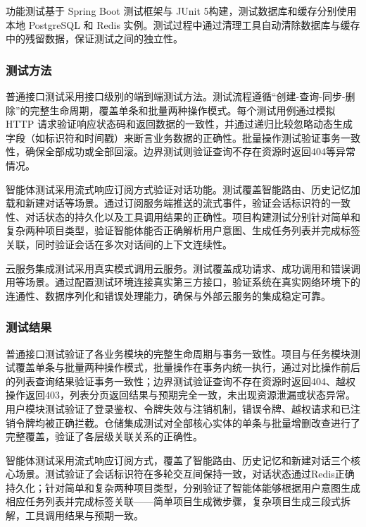 \par 功能测试基于 Spring Boot 测试框架与 JUnit 5构建，测试数据库和缓存分别使用本地 PostgreSQL 和 Redis 实例。测试过程中通过清理工具自动清除数据库与缓存中的残留数据，保证测试之间的独立性。

\subsubsection{测试方法}

\par 普通接口测试采用接口级别的端到端测试方法。测试流程遵循“创建-查询-同步-删除”的完整生命周期，覆盖单条和批量两种操作模式。每个测试用例通过模拟 HTTP 请求验证响应状态码和返回数据的一致性，并通过递归比较忽略动态生成字段（如标识符和时间戳）来断言业务数据的正确性。批量操作测试验证事务一致性，确保全部成功或全部回滚。边界测试则验证查询不存在资源时返回404等异常情况。

\par 智能体测试采用流式响应订阅方式验证对话功能。测试覆盖智能路由、历史记忆加载和新建对话等场景。通过订阅服务端推送的流式事件，验证会话标识符的一致性、对话状态的持久化以及工具调用结果的正确性。项目构建测试分别针对简单和复杂两种项目类型，验证智能体能否正确解析用户意图、生成任务列表并完成标签关联，同时验证会话在多次对话间的上下文连续性。

\par 云服务集成测试采用真实模式调用云服务。测试覆盖成功请求、成功调用和错误调用等场景。通过配置测试环境连接真实第三方接口，验证系统在真实网络环境下的连通性、数据序列化和错误处理能力，确保与外部云服务的集成稳定可靠。

\subsubsection{测试结果}

\par 普通接口测试验证了各业务模块的完整生命周期与事务一致性。项目与任务模块测试覆盖单条与批量两种操作模式，批量操作在事务内统一执行，通过对比操作前后的列表查询结果验证事务一致性；边界测试验证查询不存在资源时返回404、越权操作返回403，列表分页返回结果与预期完全一致，未出现资源泄漏或状态异常。用户模块测试验证了登录鉴权、令牌失效与注销机制，错误令牌、越权请求和已注销令牌均被正确拦截。仓储集成测试对全部核心实体的单条与批量增删改查进行了完整覆盖，验证了各层级关联关系的正确性。

\par 智能体测试采用流式响应订阅方式，覆盖了智能路由、历史记忆和新建对话三个核心场景。测试验证了会话标识符在多轮交互间保持一致，对话状态通过Redis正确持久化；针对简单和复杂两种项目类型，分别验证了智能体能够根据用户意图生成相应任务列表并完成标签关联——简单项目生成微步骤，复杂项目生成三段式拆解，工具调用结果与预期一致。

